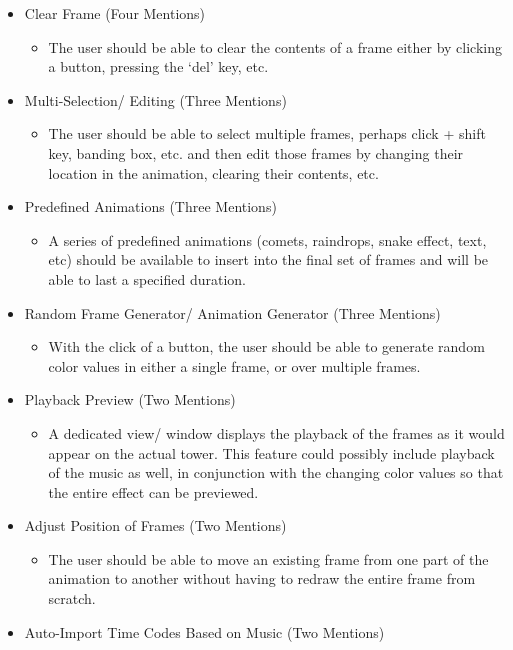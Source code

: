 \documentclass[12pt]{extarticle}
\begin{document}
\begin{itemize}
	\item Clear Frame (Four Mentions)
	\begin{itemize}
		\item The user should be able to clear the contents of a frame either by clicking a button, pressing the `del' key, etc.
	\end{itemize}
	\item Multi-Selection/ Editing (Three Mentions)
	\begin{itemize}
		\item The user should be able to select multiple frames, perhaps click + shift key, banding box, etc. and then edit those frames by changing their location in the animation, clearing their contents, etc.
	\end{itemize}
	\item Predefined Animations (Three Mentions)
	\begin{itemize}
		\item A series of predefined animations (comets, raindrops, snake effect, text, etc) should be available to insert into the final set of frames and will be able to last a specified duration.
	\end{itemize}
	\item Random Frame Generator/ Animation Generator (Three Mentions)
	\begin{itemize}
		\item With the click of a button, the user should be able to generate random color values in either a single frame, or over multiple frames.
	\end{itemize}
	\item Playback Preview (Two Mentions)
	\begin{itemize}
		\item A dedicated view/ window displays the playback of the frames as it would appear on the actual tower. This feature could possibly include playback of the music as well, in conjunction with the changing color values so that the entire effect can be previewed.
	\end{itemize}
	\item Adjust Position of Frames (Two Mentions)
	\begin{itemize}
		\item The user should be able to move an existing frame from one part of the animation to another without having to redraw the entire frame from scratch.
	\end{itemize}
	\item Auto-Import Time Codes Based on Music (Two Mentions)

\end{itemize}
\end{document}
